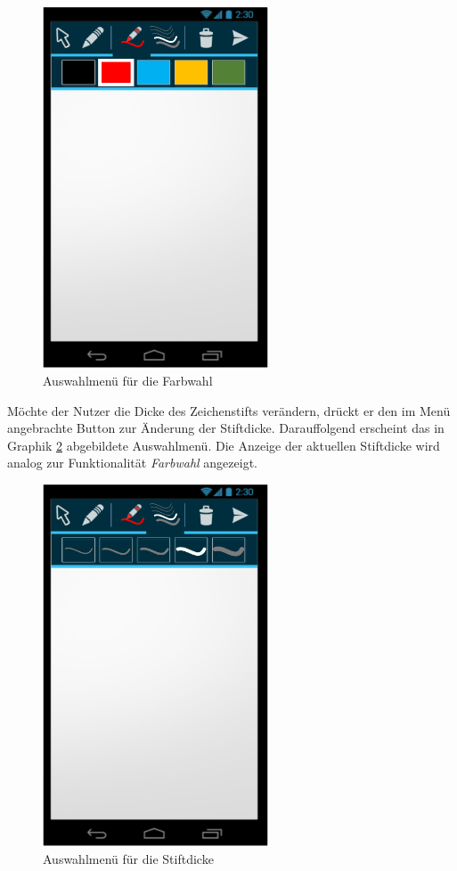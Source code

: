 \documentclass{chi-ext}
\begin{document}
\begin{figure}
  \centering
  \includegraphics[width=190pt]{img/android/mockup_color.png}
  \caption{Auswahlmenü für die Farbwahl}
  \label{fig:mockup_color}
\end{figure}

Möchte der Nutzer die Dicke des Zeichenstifts verändern, drückt er den im Menü angebrachte Button zur Änderung der Stiftdicke. Darauffolgend erscheint das in Graphik \ref{fig:mockup_pen} abgebildete Auswahlmenü. Die Anzeige der aktuellen Stiftdicke wird analog zur Funktionalität \textit{Farbwahl} angezeigt.

\begin{figure}
  \centering
  \includegraphics[width=190pt]{img/android/mockup_pen.png}
  \caption{Auswahlmenü für die Stiftdicke}
  \label{fig:mockup_pen}
\end{figure}
\end{document}
